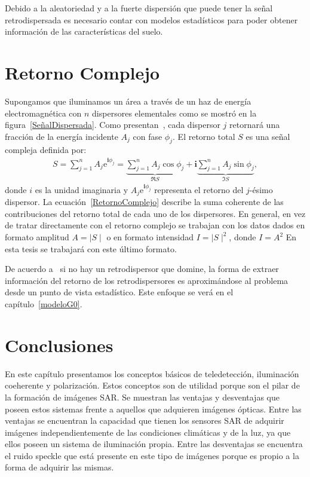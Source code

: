 Debido a la aleatoriedad y a la fuerte dispersión que puede tener la señal retrodispersada es necesario contar con modelos estadísticos para poder obtener información de las características del suelo.

\section{Retorno Complejo}
\label{RetornoComplejo}

Supongamos que iluminamos un área a través de un haz de energía electromagnética con $n$ dispersores elementales como se mostró en la figura~\ref{SeñalDispersada}. Como presentan~\citet{FreryLibro2019}, cada dispersor $j$ retornará una fracción de la energía incidente $A_j$ con fase $\phi_j$. El retorno total $S$ es una señal compleja definida por:
\begin{align}
S = \sum_{j=1}^{n} A_j \mathrm{e}^{\mathbf i \phi_j} = 
\underbrace{{\sum_{j=1}^{n} A_j \cos \phi_j}}_{\Re{S}} +\mathbf i \underbrace{ \sum_{j=1}^{n} A_j \sin \phi_j}_{\Im{S}}, 
\label{RetornoComplejo}
\end{align}
donde $i$ es la unidad imaginaria y $A_j \mathrm{e}^{\mathbf i \phi_j}$ representa el retorno del $j$-ésimo dispersor. La ecuación~\eqref{RetornoComplejo} describe la suma coherente de las contribuciones del retorno total de cada uno de los dispersores. En general, en vez de tratar directamente con el retorno complejo se trabajan con los datos dados en formato amplitud $A=\mid S \mid$ o  en formato intensidad $I=\mid S \mid^2$, donde $I=A^2$ En esta tesis se trabajará con este último formato.

De acuerdo a~\citet{Quegan1994} si no hay un retrodispersor que domine, la forma de extraer información del retorno de los retrodispersores es aproximándose al problema desde un punto de vista estadístico. Este enfoque se verá en el capítulo~\ref{modeloG0}.




\section{Conclusiones}

En este capítulo presentamos los conceptos básicos de teledetección, iluminación coeherente y polarización. Estos conceptos son de utilidad porque son el pilar de la formación de imágenes SAR. Se muestran las ventajas y desventajas que poseen estos sistemas frente a aquellos que adquieren imágenes ópticas. Entre las ventajas se encuentran la capacidad que tienen los sensores SAR de adquirir imágenes independientemente de las condiciones climáticas y de la luz, ya que ellos poseen un sistema de iluminación propia. Entre las desventajas se encuentra el ruido speckle que está presente en este tipo de imágenes porque es propio a la forma de adquirir las mismas. 

